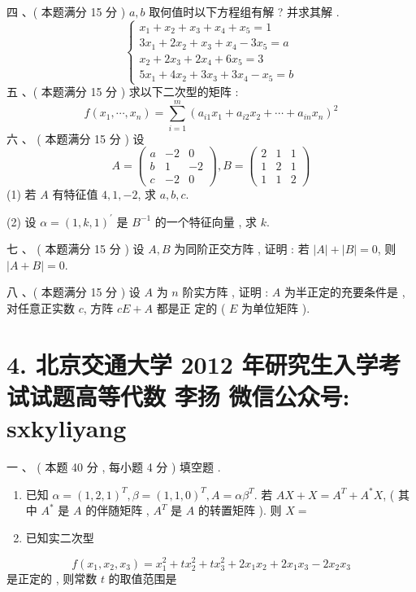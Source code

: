 \documentclass[10pt]{article}
\begin{document}
{ 四 、( 本题满分  15  分 ) $a, b$  取何值时以下方程组有解 ?  并求其解 .
$$
\left\{\begin{array}{l}
x_{1}+x_{2}+x_{3}+x_{4}+x_{5}=1 \\
3 x_{1}+2 x_{2}+x_{3}+x_{4}-3 x_{5}=a \\
x_{2}+2 x_{3}+2 x_{4}+6 x_{5}=3 \\
5 x_{1}+4 x_{2}+3 x_{3}+3 x_{4}-x_{5}=b
\end{array}\right.
$$
 五 、( 本题满分  15  分 )  求以下二次型的矩阵 :
$$
f\left(x_{1}, \cdots, x_{n}\right)=\sum_{i=1}^{m}\left(a_{i 1} x_{1}+a_{i 2} x_{2}+\cdots+a_{i n} x_{n}\right)^{2}
$$
 六 、 ( 本题满分  15  分 )  设 
$$
A=\left(\begin{array}{ccc}
a & -2 & 0 \\
b & 1 & -2 \\
c & -2 & 0
\end{array}\right), B=\left(\begin{array}{lll}
2 & 1 & 1 \\
1 & 2 & 1 \\
1 & 1 & 2
\end{array}\right)
$$
(1)  若  $A$  有特征值  $4,1,-2$,  求  $a, b, c$.

(2)  设  $\alpha=(1, k, 1)^{\prime}$  是  $B^{-1}$  的一个特征向量 ,  求  $k$.

 七 、 ( 本题满分  15  分 )  设  $A, B$  为同阶正交方阵 ,  证明 :  若  $|A|+|B|=0$,  则  $|A+B|=0$.

 八 、( 本题满分  15  分 )  设  $A$  为  $n$  阶实方阵 ,  证明 : $A$  为半正定的充要条件是 ,  对任意正实数  $c$,  方阵  $c E+A$  都是正   定的  ( $E$  为单位矩阵 ).

\section{4. 北京交通大学 2012 年研究生入学考试试题高等代数 
 李扬 
 微信公众号: sxkyliyang}
 一 、 ( 本题  40  分 ,  每小题  4  分 )  填空题 .

\begin{enumerate}
  \item  已知  $\alpha=(1,2,1)^{T}, \beta=(1,1,0)^{T}, A=\alpha \beta^{T}$.  若  $A X+X=A^{T}+A^{*} X$, ( 其中  $A^{*}$  是  $A$  的伴随矩阵 , $A^{T}$  是  $A$  的转置矩阵 ).  则  $X=$

  \item  已知实二次型 

\end{enumerate}
$$
f\left(x_{1}, x_{2}, x_{3}\right)=x_{1}^{2}+t x_{2}^{2}+t x_{3}^{2}+2 x_{1} x_{2}+2 x_{1} x_{3}-2 x_{2} x_{3}
$$
 是正定的 ,  则常数  $t$  的取值范围是 

}
\end{document}
